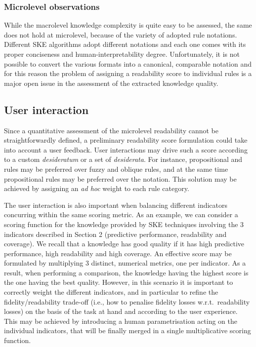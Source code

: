 \documentclass[sigconf]{acmart}
\begin{document}
\subsubsection{Microlevel observations}

While the macrolevel knowledge complexity is quite easy to be assessed, the same does not hold at microlevel, because of the variety of adopted rule notations.
%
Different SKE algorithms adopt different notations and each one comes with its proper conciseness and human-interpretability degree.
%
Unfortunately, it is not possible to convert the various formats into a canonical, comparable notation and for this reason the problem of assigning a readability score to individual rules is a major open issue in the assessment of the extracted knowledge quality.

\subsection{User interaction}

Since a quantitative assessment of the microlevel readability cannot be straightforwardly defined, a preliminary readability score formulation could take into account a user feedback.
%
User interactions may drive such a score according to a custom \emph{desideratum} or a set of \emph{desiderata}.
%
For instance, propositional and \mofn{} rules may be preferred over fuzzy and oblique rules, and at the same time propositional rules may be preferred over the \mofn{} notation.
%
This solution may be achieved by assigning an \emph{ad hoc} weight to each rule category.

The user interaction is also important when balancing different indicators concurring within the same scoring metric.
%
As an example, we can consider a scoring function for the knowledge provided by SKE techniques involving the 3 indicators described in Section 2 (predictive performance, readability and coverage).
%
We recall that a knowledge has good quality if it has high predictive performance, high readability and high coverage.
%
An effective score may be formulated by multiplying 3 distinct, numerical metrics, one per indicator.
%
As a result, when performing a comparison, the knowledge having the highest score is the one having the best quality.
%
However, in this scenario it is important to correctly weight the different indicators, and in particular to refine the fidelity/readability trade-off (i.e., how to penalise fidelity losses w.r.t.\ readability losses) on the basis of the task at hand and according to the user experience.
%
This may be achieved by introducing a human parametrisation acting on the individual indicators, that will be finally merged in a single multiplicative scoring function.
\end{document}
